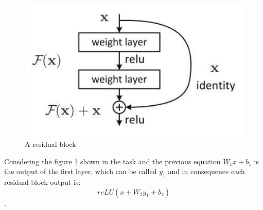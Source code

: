 \documentclass[11pt]{article} %
\begin{document}
\begin{figure}
	\centering
    \includegraphics[scale=0.5]{images/layers.PNG}
    \caption{A residual block}
    \label{residual}
\end{figure}

Consdering the figure \ref{residual} shown in the task and the previous equation $W_1x+b_1$ is the output of the first layer, which can be called $y_1$ and in consequence 
each residual block output is: \[reLU(x+W_2y_1+b_2)\].
\end{document}
